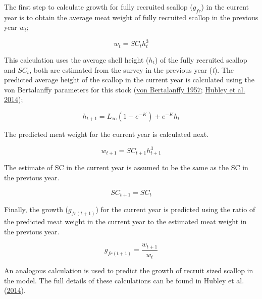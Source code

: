 \documentclass[
]{article}
\begin{document}
The first step to calculate growth for fully recruited scallop (\(g_{fr}\)) in the current year is to obtain the average meat weight of fully recruited scallop in the previous year \(w_{t}\);

\[ w_{t} = SC_{t} h^3_{t} \]

This calculation uses the average shell height (\(h_t\)) of the fully recruited scallop and \(SC_t\), both are estimated from the survey in the previous year (\emph{t}). The predicted average height of the scallop in the current year is calculated using the von Bertalanffy parameters for this stock (\protect\hyperlink{ref-vonbertalanffyQuantitativeLawsMetabolism1957}{von Bertalanffy 1957}; \protect\hyperlink{ref-hubleyGeorgesBankBrowns2014}{Hubley et al. 2014});

\[ h_{t+1} = L_\infty(1-e^{-K}) + e^{-K}h_t  \]

The predicted meat weight for the current year is calculated next.

\[ w_{t+1} = SC_{t+1} h^3_{t+1} \]

The estimate of SC in the current year is assumed to be the same as the SC in the previous year.

\[SC_{t+1} = SC_t\]

Finally, the growth (\(g_{fr(t+1)}\)) for the current year is predicted using the ratio of the predicted meat weight in the current year to the estimated meat weight in the previous year.

\[ g_{fr(t+1)} = \frac{w_{t+1}}{w_{t}} \]

An analogous calculation is used to predict the growth of recruit sized scallop in the model. The full details of these calculations can be found in Hubley et al. (\protect\hyperlink{ref-hubleyGeorgesBankBrowns2014}{2014}).
\end{document}
